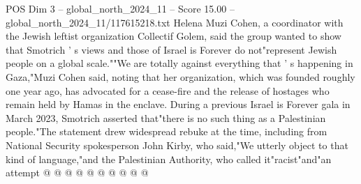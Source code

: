 \begin{textsample}{POS Dim 3 – global\_north\_2024\_11 – Score 15.00 – global\_north\_2024\_11/117615218.txt}
Helena Muzi Cohen, a coordinator with the Jewish leftist organization Collectif Golem, said the group wanted to show that Smotrich ' s views and those of Israel is Forever do not"represent Jewish people on a global scale.""We are totally against everything that ' s happening in Gaza,"Muzi Cohen said, noting that her organization, which was founded roughly one year ago, has advocated for a cease-fire and the release of hostages who remain held by Hamas in the enclave.
During a previous Israel is Forever gala in March 2023, Smotrich asserted that"there is no such thing as a Palestinian people."The statement drew widespread rebuke at the time, including from National Security spokesperson John Kirby, who said,"We utterly object to that kind of language,"and the Palestinian Authority, who called it"racist"and"an attempt @ @ @ @ @ @ @ @ @ @

\end{textsample}
